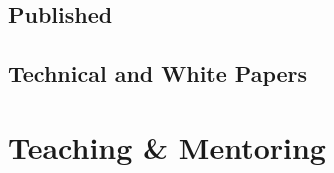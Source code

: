 \documentclass[11pt,letterpaper,sans,unicode]{moderncv}
\begin{document}
%

\subsection{Published}

\begin{etaremune}[leftmargin=8mm]

\end{etaremune}

\subsection{Technical and White Papers}

\begin{etaremune}[leftmargin=8mm]

\end{etaremune}

\section{Teaching \& Mentoring}

\end{document}

